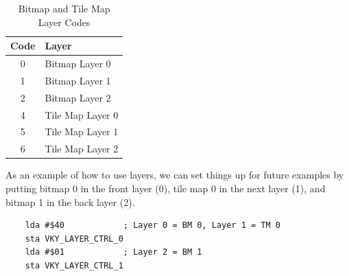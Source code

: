 \begin{table}[ht]
    \begin{center}
        \begin{tabular}{|c|l|} \hline
            Code & Layer \\ \hline\hline
            0 & Bitmap Layer 0 \\ \hline
            1 & Bitmap Layer 1 \\ \hline
            2 & Bitmap Layer 2 \\ \hline
            4 & Tile Map Layer 0 \\ \hline
            5 & Tile Map Layer 1 \\ \hline
            6 & Tile Map Layer 2 \\ \hline
        \end{tabular}
    \end{center}
    \caption{Bitmap and Tile Map Layer Codes}
    \label{tab:bm_tm_layer_codes}
\end{table}


As an example of how to use layers, we can set things up for future examples by putting bitmap 0 in the front layer (0), tile map 0 in the next layer (1), and bitmap 1 in the back layer (2).

\begin{verbatim}
    lda #$40            ; Layer 0 = BM 0, Layer 1 = TM 0
    sta VKY_LAYER_CTRL_0
    lda #$01            ; Layer 2 = BM 1
    sta VKY_LAYER_CTRL_1
\end{verbatim}
